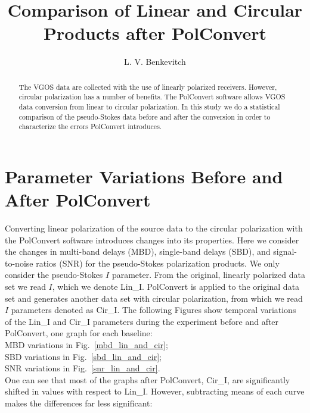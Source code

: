 \documentclass[letterpaper,twoside,12pt]{article}
\title{Comparison of Linear and Circular Products after PolConvert}
\author[1]{L. V. Benkevitch}
\affil[1]{\small MIT Haystack observatory, Westford, MA 01886, USA.}
\begin{document}
\maketitle

\begin{abstract}

The VGOS data are collected with the use of linearly polarized receivers. However, circular polarization has a number of benefits. The PolConvert software allows VGOS data conversion from linear to circular polarization. In this study we do a statistical comparison of the pseudo-Stokes data before and after the conversion in order to characterize the errors PolConvert introduces.

\end{abstract}


\tableofcontents


\section{Parameter Variations Before and After PolConvert}

Converting linear polarization of the source data to the circular polarization with the PolConvert software introduces changes into its properties. Here we consider the changes in multi-band delays (MBD), single-band delays (SBD), and signal-to-noise ratios (SNR) for the pseudo-Stokes polarization products. We only consider the pseudo-Stokes $I$ parameter. From the original, linearly polarized data set we read $I$, which we denote Lin\_I. PolConvert is applied to the original data set and generates another data set with circular polarization, from which we read $I$ parameters denoted as Cir\_I. The following Figures show temporal variations of the Lin\_I and Cir\_I parameters during the experiment before and after PolConvert, one graph for each baseline:  \\


\indent MBD variations in Fig.~\ref{mbd_lin_and_cir};  \\
\indent SBD variations in Fig.~\ref{sbd_lin_and_cir};  \\
\indent SNR variations in Fig.~\ref{snr_lin_and_cir}.  \\


One can see that most of the graphs after PolConvert, Cir\_I, are significantly shifted in values with respect to Lin\_I. However, subtracting means of each curve makes the differences far less significant: \\
\end{document}
